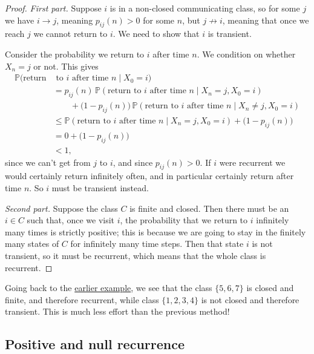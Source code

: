 \documentclass[
  a4paper,
]{article}
\theoremstyle{definition}
\theoremstyle{definition}
\theoremstyle{definition}
\theoremstyle{remark}
\begin{document}
\begin{proof}

\emph{First part.} Suppose \(i\) is in a non-closed communicating class, so for some \(j\) we have \(i \to j\), meaning \(p_{ij}(n) > 0\) for some \(n\), but \(j \not\to i\), meaning that once we reach \(j\) we cannot return to \(i\). We need to show that \(i\) is transient.

Consider the probability we return to \(i\) after time \(n\). We condition on whether \(X_n = j\) or not. This gives
\begin{align*}
\mathbb P(\text{return} & \text{ to } i \text{ after time $n$} \mid X_0 = i) \\
&= p_{ij}(n)\,\mathbb P(\text{return to $i$ after time $n$} \mid X_n = j, X_0 = i) \\
&\qquad {}+ \big(1 - p_{ij}(n)\big)\,\mathbb P(\text{return to $i$ after time $n$} \mid X_n \neq j, X_0 = i) \\
&\leq \mathbb P(\text{return to $i$ after time $n$} \mid X_n = j, X_0 = i) +  \big(1 - p_{ij}(n)\big) \\
&= 0 + \big(1 - p_{ij}(n)\big) \\
&< 1,
\end{align*}
since we can't get from \(j\) to \(i\), and since \(p_{ij}(n) > 0\). If \(i\) were recurrent we would certainly return infinitely often, and in particular certainly return after time \(n\). So \(i\) must be transient instead.

\emph{Second part.} Suppose the class \(C\) is finite and closed. Then there must be an \(i \in C\) such that, once we visit \(i\), the probability that we return to \(i\) infinitely many times is strictly positive; this is because we are going to stay in the finitely many states of \(C\) for infinitely many time steps. Then that state \(i\) is not transient, so it must be recurrent, which means that the whole class is recurrent.

\end{proof}

Going back to the \protect\hyperlink{exm:rec}{earlier example}, we see that the class \(\{5,6,7\}\) is closed and finite, and therefore recurrent, while class \(\{1,2,3,4\}\) is not closed and therefore transient. This is much less effort than the previous method!

\hypertarget{S09-positive-null}{%
\subsection{Positive and null recurrence}\label{S09-positive-null}}
\end{document}
